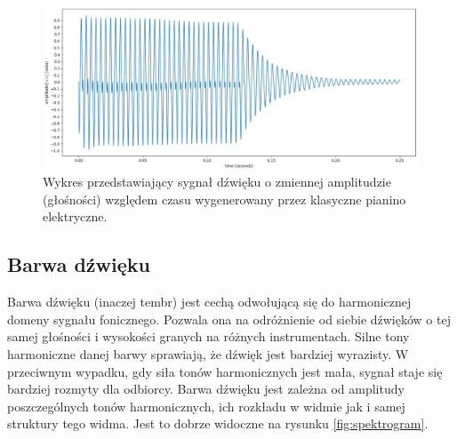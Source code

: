 \documentclass[12pt,a4paper,twoside]{mwart}
\begin{document}
\begin{figure}[H]
  \begin{center}
    \includegraphics[scale=0.32]{images/Amplitude.jpg}
    \caption{Wykres przedstawiający sygnał dźwięku o zmiennej amplitudzie (głośności) względem czasu wygenerowany przez klasyczne pianino elektryczne.}
    \label{fig:amplitude}
  \end{center}
\end{figure}

\subsection{Barwa dźwięku}\label{sec:barwaDzwieku}
Barwa dźwięku (inaczej tembr) jest cechą odwołującą się do harmonicznej domeny sygnału fonicznego. Pozwala ona na odróżnienie od siebie dźwięków o tej samej głośności i wysokości granych na różnych instrumentach. Silne tony harmoniczne danej barwy sprawiają, że dźwięk jest bardziej wyrazisty. W przeciwnym wypadku, gdy siła tonów harmonicznych jest mała, sygnał staje się bardziej rozmyty dla odbiorcy. Barwa dźwięku jest zależna od amplitudy poszczególnych tonów harmonicznych, ich rozkładu w widmie jak i samej struktury tego widma. Jest to dobrze widoczne na rysunku \ref{fig:spektrogram}.
\end{document}
